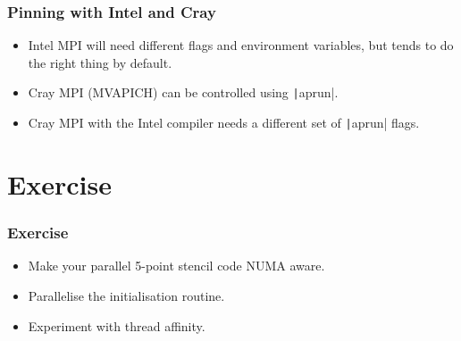 \documentclass{beamer}
\begin{document}
\begin{frame}
\frametitle{Pinning with Intel and Cray}
\begin{itemize}
  \item Intel MPI will need different flags and environment variables, but tends to do the right thing by default.
  \item Cray MPI (MVAPICH) can be controlled using \texttt|aprun|.
  \item Cray MPI with the Intel compiler needs a different set of \texttt|aprun| flags.
\end{itemize}
\end{frame}

\section{Exercise}
\begin{frame}
\frametitle{Exercise}
\begin{itemize}
  \item Make your parallel 5-point stencil code NUMA aware.
  \item Parallelise the initialisation routine.
  \item Experiment with thread affinity.
\end{itemize}
\end{frame}

\end{document}
